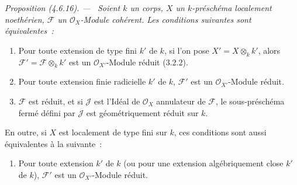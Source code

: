 \documentclass[10pt,oneside]{book}
\newcommand{\oldpage}[2][]{%
  \setcounter{footnote}{0}%
  \marginpar{\scriptsize\textbf{#1}~|~#2}\ignorespaces}
\newenvironment{proposition}[1][]{%
  \par\medskip\noindent\itshape Proposition (#1). ---\ }{\par}
\begin{document}
\begin{proposition}[4.6.16]
\label{IV.2.4.6.16-fr}
Soient $k$ un corps, $X$ un $k$-préschéma localement noethérien, $\mathscr F$
un $\mathcal O_X$-Module cohérent. Les conditions suivantes sont
équivalentes~:
\begin{enumerate}
\item[a)] Pour toute extension de type fini $k'$ de $k$, si l'on pose
$X'=X\otimes_k k'$, alors $\mathscr F'=\mathscr F\otimes_k k'$ est un
$\mathcal O_{X'}$-Module réduit (3.2.2).
\item[b)] Pour toute extension finie radicielle $k'$ de $k$, $\mathscr F'$ est
un $\mathcal O_{X'}$-Module réduit.
\item[c)] $\mathscr F$ est réduit, et si $\mathscr J$ est l'Idéal de
$\mathcal O_X$ annulateur de $\mathscr F$, le sous-préschéma fermé défini par
$\mathscr J$ est géométriquement réduit sur $k$.
\end{enumerate}

\oldpage[IV-2]{73}

En outre, si $X$ est localement de type fini sur $k$, ces conditions sont aussi
équivalentes à la suivante~:
\begin{enumerate}
\item[d)] Pour toute extension $k'$ de $k$ (ou pour une extension
algébriquement close $k'$ de $k$), $\mathscr F'$ est un
$\mathcal O_{X'}$-Module réduit.
\end{enumerate}
\end{proposition}
\end{document}

